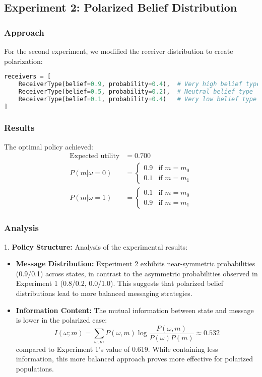 \documentclass[12pt]{article}
\theoremstyle{plain}
\theoremstyle{definition}
\theoremstyle{remark}
\begin{document}
\subsection{Experiment 2: Polarized Belief Distribution}

\subsubsection{Approach}
For the second experiment, we modified the receiver distribution to create polarization:

\begin{lstlisting}[language=Python, caption=Experiment 2 Setup]
receivers = [
    ReceiverType(belief=0.9, probability=0.4),  # Very high belief type
    ReceiverType(belief=0.5, probability=0.2),  # Neutral belief type
    ReceiverType(belief=0.1, probability=0.4)   # Very low belief type
]
\end{lstlisting}

\subsubsection{Results}
The optimal policy achieved:
\begin{align*}
    \text{Expected utility} &= 0.700 \\
    P(m|\omega=0) &= \begin{cases}
        0.9 & \text{if } m = m_0 \\
        0.1 & \text{if } m = m_1
    \end{cases} \\
    P(m|\omega=1) &= \begin{cases}
        0.1 & \text{if } m = m_0 \\
        0.9 & \text{if } m = m_1
    \end{cases}
\end{align*}

\subsubsection{Analysis}
1. \textbf{Policy Structure:} Analysis of the experimental results:
\begin{itemize}
    \item \textbf{Message Distribution:} Experiment 2 exhibits near-symmetric probabilities (0.9/0.1) across states, in contrast to the asymmetric probabilities observed in Experiment 1 (0.8/0.2, 0.0/1.0). This suggests that polarized belief distributions lead to more balanced messaging strategies.
    
    \item \textbf{Information Content:} The mutual information between state and message is lower in the polarized case:
    \[I(\omega;m) = \sum_{\omega,m} P(\omega,m)\log\frac{P(\omega,m)}{P(\omega)P(m)} \approx 0.532\]
    compared to Experiment 1's value of 0.619. While containing less information, this more balanced approach proves more effective for polarized populations.
\end{itemize}
\end{document}
